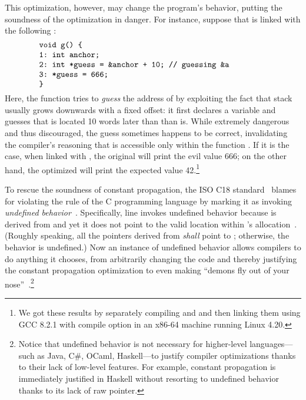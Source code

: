 This optimization, however, may change the program's behavior, putting the soundness of the
optimization in danger.  For instance, suppose that  is linked with the following
:
%
\[
\begin{minipage}{0.8\textwidth}
\begin{verbatim}
void g() {
1: int anchor;
2: int *guess = &anchor + 10; // guessing &a
3: *guess = 666;
}
\end{verbatim}
\end{minipage}
\]
%
\noindent Here, the function  tries to \emph{guess} the address of  by exploiting
the fact that stack usually grows downwards with a fixed offset: it first declares a variable
 and guesses that  is located 10 words later than than  is.  While
extremely dangerous and thus discouraged, the guess sometimes happens to be correct, invalidating
the compiler's reasoning that  is accessible only within the function .  If it is
the case, when linked with , the original  will print the evil value 666; on the
other hand, the optimized  will print the expected value 42.\footnote{We got these results
  by separately compiling  and  and then linking them using GCC 8.2.1 with
  compile option  in an x86-64 machine running Linux 4.20.}

To rescue the soundness of constant propagation, the ISO C18 standard~\cite{c18} blames 
for violating the rule of the C programming language by marking it as invoking \emph{undefined
  behavior}~\cite[\S3.4.3p1]{c18}.  Specifically, line  invokes undefined behavior because
 is derived from  and yet it does not point to the valid location within
's allocation~\cite[\S6.5.6p8]{c18}.  (Roughly speaking, all the pointers derived from
 \emph{shall} point to ; otherwise, the behavior is undefined.)  Now an
instance of undefined behavior allows compilers to do anything it chooses, from arbitrarily changing
the code and thereby justifying the constant propagation optimization to even making ``demons fly
out of your nose''~\cite{nasal-demons}.\footnote{Notice that undefined behavior is not necessary for
  higher-level languages---such as Java, C\#, OCaml, Haskell---to justify compiler optimizations
  thanks to their lack of low-level features.  For example, constant propagation is immediately
  justified in Haskell without resorting to undefined behavior thanks to its lack of raw pointer.}


